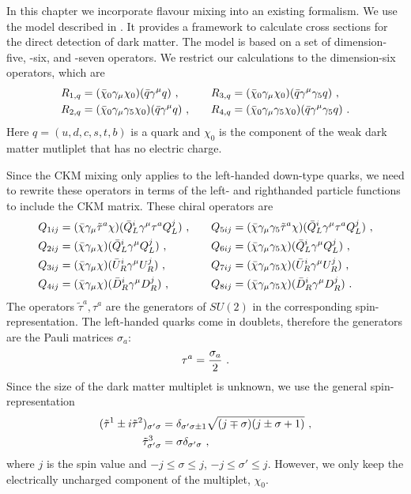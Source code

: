 In this chapter we incorporate flavour mixing into an existing formalism. We use the model described in \cite{ChiralEFT}. It provides a framework to calculate cross sections for the direct detection of dark matter. The model is based on a set of dimension-five, -six, and -seven operators. We restrict our calculations to the dimension-six operators, which are
\begin{align}\label{eq:normal}
	R_{1,q} &= (\bar{\chi}_0\gamma_\mu\chi_0)(\bar{q}\gamma^\mu q) \ , && &R_{3,q} &= (\bar{\chi}_0\gamma_\mu\chi_0)(\bar{q}\gamma^\mu\gamma_5q) \ , \notag \\
	R_{2,q} &= (\bar{\chi}_0\gamma_\mu\gamma_5\chi_0)(\bar{q}\gamma^\mu q) \ , &&	&R_{4,q} &= (\bar{\chi}_0\gamma_\mu\gamma_5\chi_0)(\bar{q}\gamma^\mu\gamma_5q) \ .
\end{align}
Here $q=(u,d,c,s,t,b)$ is a quark and $\chi_0$ is the component of the weak dark matter mutliplet that has no electric charge.


Since the CKM mixing only applies to the left-handed down-type quarks, we need to rewrite these operators in terms of the left- and righthanded particle functions to include the CKM matrix. These chiral operators are
\begin{align}\label{eq:chiral}
	Q_{1ij} &= (\bar{\chi}\gamma_\mu\tilde{\tau}^a\chi)(\bar{Q}_L^i\gamma^\mu \tau^aQ_L^j) \ , && &Q_{5ij} &= (\bar{\chi}\gamma_\mu\gamma_5\tilde{\tau}^a\chi)(\bar{Q}_L^i\gamma^\mu \tau^aQ_L^j) \ , \notag \\
	Q_{2ij} &= (\bar{\chi}\gamma_\mu\chi)(\bar{Q}_L^i\gamma^\mu Q_L^j) \ , && &Q_{6ij} &= (\bar{\chi}\gamma_\mu\gamma_5\chi)(\bar{Q}_L^i\gamma^\mu Q_L^j) \ , \notag \\
	Q_{3ij} &= (\bar{\chi}\gamma_\mu\chi)(\bar{U}_R^i\gamma^\mu U_R^j) \ , && &Q_{7ij} &= (\bar{\chi}\gamma_\mu\gamma_5\chi)(\bar{U}_R^i\gamma^\mu U_R^j) \ , \notag \\
	Q_{4ij} &= (\bar{\chi}\gamma_\mu\chi)(\bar{D}_R^i\gamma^\mu D_R^j) \ , && &Q_{8ij} &= (\bar{\chi}\gamma_\mu\gamma_5\chi)(\bar{D}_R^i\gamma^\mu D_R^j) \ .
\end{align}
The operators $\tilde{\tau}^a,\tau^a$ are the generators of $SU(2)$ in the corresponding spin-\-representation. The left-handed quarks come in doublets, therefore the generators are the Pauli matrices $\sigma_a$:
\begin{align}
	\tau^a = \frac{\sigma_a}{2} \ . \notag
\end{align}
Since the size of the dark matter multiplet is unknown, we use the general spin-representation
\begin{align}
	(\tilde{\tau}^1 \pm i\tilde{\tau}^2)_{\sigma'\sigma} &= \delta_{\sigma'\sigma\pm1}\sqrt{(j\mp\sigma)(j\pm\sigma+1)} \ , \notag \\
	\tilde{\tau}^3_{\sigma'\sigma} &= \sigma\delta_{\sigma'\sigma} \ , \notag
\end{align}
where $j$ is the spin value and $-j\leq\sigma\leq j$, $-j\leq\sigma'\leq j$. However, we only keep the electrically uncharged component of the multiplet, $\chi_0$.

